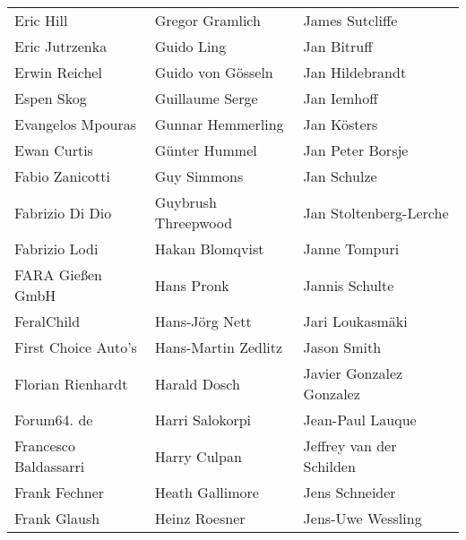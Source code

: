 \begin{tabular}{p{4.5cm}p{4.5cm}p{4.5cm}}
Eric Hill & Gregor Gramlich & James Sutcliffe \\
Eric Jutrzenka & Guido Ling & Jan Bitruff \\
Erwin Reichel & Guido von Gösseln & Jan Hildebrandt \\
Espen Skog & Guillaume Serge & Jan Iemhoff \\
Evangelos Mpouras & Gunnar Hemmerling & Jan Kösters \\
Ewan Curtis & Günter Hummel & Jan Peter Borsje \\
Fabio Zanicotti & Guy Simmons & Jan Schulze \\
Fabrizio Di Dio & Guybrush Threepwood & Jan Stoltenberg-Lerche \\
Fabrizio Lodi & Hakan Blomqvist & Janne Tompuri \\
FARA Gießen GmbH & Hans Pronk & Jannis Schulte \\
FeralChild & Hans-Jörg Nett & Jari Loukasmäki \\
First Choice Auto's & Hans-Martin Zedlitz & Jason Smith \\
Florian Rienhardt & Harald Dosch & Javier Gonzalez Gonzalez \\
Forum64. de & Harri Salokorpi & Jean-Paul Lauque \\
Francesco Baldassarri & Harry Culpan & Jeffrey van der Schilden \\
Frank Fechner & Heath Gallimore & Jens Schneider \\
Frank Glaush & Heinz Roesner & Jens-Uwe Wessling \\
\end{tabular}
\newpage
\setlength{\tabcolsep}{1mm}
